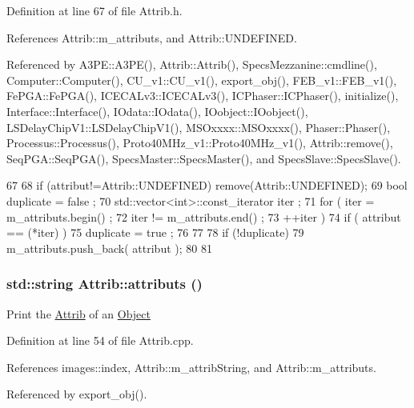 Definition at line 67 of file Attrib.h.

References Attrib::m\_\-attributs, and Attrib::UNDEFINED.

Referenced by A3PE::A3PE(), Attrib::Attrib(), SpecsMezzanine::cmdline(), Computer::Computer(), CU\_\-v1::CU\_\-v1(), export\_\-obj(), FEB\_\-v1::FEB\_\-v1(), FePGA::FePGA(), ICECALv3::ICECALv3(), ICPhaser::ICPhaser(), initialize(), Interface::Interface(), IOdata::IOdata(), IOobject::IOobject(), LSDelayChipV1::LSDelayChipV1(), MSOxxxx::MSOxxxx(), Phaser::Phaser(), Processus::Processus(), Proto40MHz\_\-v1::Proto40MHz\_\-v1(), Attrib::remove(), SeqPGA::SeqPGA(), SpecsMaster::SpecsMaster(), and SpecsSlave::SpecsSlave().


\begin{DoxyCode}
67                             {
68     if (attribut!=Attrib::UNDEFINED) remove(Attrib::UNDEFINED);
69     bool duplicate = false ;
70     std::vector<int>::const_iterator iter ;
71     for ( iter  = m_attributs.begin() ;
72           iter != m_attributs.end()   ;
73           ++iter ) {
74       if ( attribut == (*iter) ) {
75         duplicate = true ;
76       }
77     }
78     if (!duplicate) {
79       m_attributs.push_back( attribut );
80     }
81   }
\end{DoxyCode}
\hypertarget{classAttrib_aee7bbf16b144887f196e1341b24f8a26}{
\subsubsection[{attributs}]{\setlength{\rightskip}{0pt plus 5cm}std::string Attrib::attributs ()}}
\label{classAttrib_aee7bbf16b144887f196e1341b24f8a26}
Print the \hyperlink{classAttrib}{Attrib} of an \hyperlink{classObject}{Object} 

Definition at line 54 of file Attrib.cpp.

References images::index, Attrib::m\_\-attribString, and Attrib::m\_\-attributs.

Referenced by export\_\-obj().


